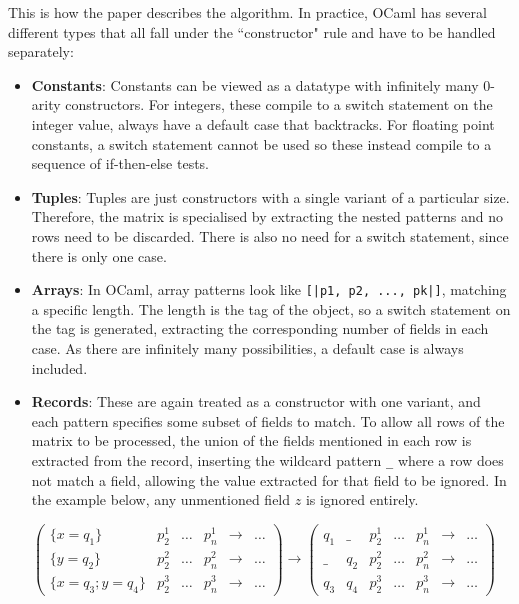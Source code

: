 This is how the paper describes the algorithm. In practice, OCaml has several different types that all fall under the ``constructor" rule and have to be handled separately:
\begin{itemize}
\item \textbf{Constants}: Constants can be viewed as a datatype with infinitely many 0-arity constructors. For integers, these compile to a switch statement on the integer value, always have a default case that backtracks. For floating point constants, a switch statement cannot be used so these instead compile to a sequence of if-then-else tests.

\item \textbf{Tuples}: Tuples are just constructors with a single variant of a particular size. Therefore, the matrix is specialised by extracting the nested patterns and no rows need to be discarded. There is also no need for a switch statement, since there is only one case.

\item \textbf{Arrays}: In OCaml, array patterns look like \verb"[|p1, p2, ..., pk|]", matching a specific length. The length is the tag of the object, so a switch statement on the tag is generated, extracting the corresponding number of fields in each case. As there are infinitely many possibilities, a default case is always included.

\item \textbf{Records}: These are again treated as a constructor with one variant, and each pattern specifies some subset of fields to match. To allow all rows of the matrix to be processed,  the union of the fields mentioned in each row is extracted from the record, inserting the wildcard pattern \verb|_| where a row does not match a field, allowing the value extracted for that field to be ignored. In the example below, any unmentioned field $z$ is ignored entirely.

$
\begin{pmatrix}
\{x=q_1\} & p^1_2 & \dots & p^1_n & \to & \dots \\
\{y=q_2\} & p^2_2 & \dots & p^2_n & \to &\dots \\
\{x=q_3; y=q_4\} & p^3_2 & \dots & p^3_n & \to &\dots
\end{pmatrix}
\to
\begin{pmatrix}
q_1 & \_ & p^1_2 & \dots & p^1_n  & \to & \dots \\
\_ & q_2 & p^2_2 & \dots & p^2_n  & \to & \dots \\
 q_3 & q_4 & p^3_2 & \dots & p^3_n  & \to & \dots
\end{pmatrix}
$
\end{itemize}


